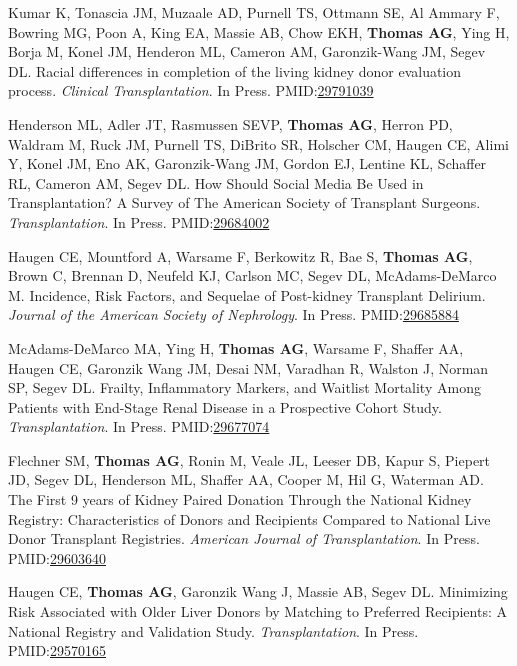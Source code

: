 \documentclass[10pt]{article}
\makeatletter
\newlength{\bibhang}
\newlength{\bibsep}
 {\@listi \global\bibsep\itemsep \global\advance\bibsep by\parsep}
\newenvironment{bibenum*}
  {\renewcommand\labelenumi{[\theenumi]}%
   \etaremune[
     topsep=0pt,
     itemsep=\bibsep,
     parsep=0pt,partopsep=0pt,
     itemindent=-\bibhang,
     leftmargin={\bibhang+\widthof{[999]}}]}
  {\endetaremune}
\newcommand{\pmid}[1]{PMID:\href{https://www.ncbi.nlm.nih.gov/pubmed/#1}{#1}}
\makeatother
\begin{document}
\begin{bibenum*}
\item Kumar K, Tonascia JM, Muzaale AD, Purnell TS, Ottmann SE,
  Al Ammary F, Bowring MG, Poon A, King EA, Massie AB, Chow EKH,
  \textbf{Thomas AG}, Ying H, Borja M, Konel JM, Henderon ML,
  Cameron AM, Garonzik-Wang JM, Segev DL. Racial differences in
  completion of the living kidney donor evaluation process.
  \emph{Clinical Transplantation}. In Press.
  \pmid{29791039} 

\item Henderson ML, Adler JT, Rasmussen SEVP, \textbf{Thomas AG},
  Herron PD, Waldram M, Ruck JM, Purnell TS, DiBrito SR, Holscher CM,
  Haugen CE, Alimi Y, Konel JM, Eno AK, Garonzik-Wang JM, Gordon EJ,
  Lentine KL, Schaffer RL, Cameron AM, Segev DL.
  How Should Social Media Be Used in Transplantation?
  A Survey of The American Society of Transplant Surgeons.
  \emph{Transplantation}. In Press.
  \pmid{29684002} 

\item Haugen CE, Mountford A, Warsame F, Berkowitz R, Bae S,
  \textbf{Thomas AG}, Brown C, Brennan D, Neufeld KJ, Carlson MC,
  Segev DL, McAdams-DeMarco M.
  Incidence, Risk Factors, and Sequelae of Post-kidney Transplant Delirium.
  \emph{Journal of the American Society of Nephrology}. In Press.
  \pmid{29685884} 

\item McAdams-DeMarco MA, Ying H, \textbf{Thomas AG}, Warsame F,
  Shaffer AA, Haugen CE, Garonzik Wang JM, Desai NM, Varadhan R,
  Walston J, Norman SP, Segev DL. Frailty, Inflammatory Markers, and
  Waitlist Mortality Among Patients with End-Stage Renal Disease in a
  Prospective Cohort Study.
  \emph{Transplantation}. In Press.
  \pmid{29677074} 

\item Flechner SM, \textbf{Thomas AG}, Ronin M,
  Veale JL, Leeser DB, Kapur S, Piepert JD, Segev DL, Henderson ML,
  Shaffer AA, Cooper M, Hil G, Waterman AD.
  The First 9 years of Kidney Paired Donation Through the National Kidney
  Registry: Characteristics of Donors and Recipients Compared to National Live
  Donor Transplant Registries.
  \emph{American Journal of Transplantation}. In Press.
  \pmid{29603640} 

\item Haugen CE, \textbf{Thomas AG}, Garonzik Wang J, Massie AB,
  Segev DL. Minimizing Risk Associated with Older Liver Donors by
  Matching to Preferred Recipients: A National Registry and
  Validation Study.
  \emph{Transplantation}. In Press.
  \\\pmid{29570165} 


\end{bibenum*}
\end{document}

